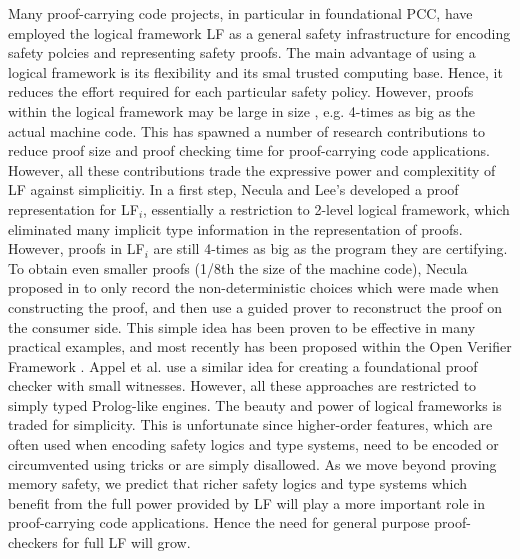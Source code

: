 \documentclass{acmconf}
\begin{document}
Many proof-carrying code projects, in particular in foundational PCC,
have employed the logical framework LF as a general safety
infrastructure for encoding safety polcies and representing safety
proofs\cite{AppelFelty00,Crary:POPL03,AppelFelten99,Crary:CADE03}.
The main advantage of using a logical framework is its flexibility
and its smal trusted computing base. Hence, it reduces the effort
required for each particular safety policy. However, proofs within the
logical framework may be large in size 
, e.g. 4-times as big as the
actual machine code. This has spawned a number of research
contributions to reduce proof size and proof checking time for
proof-carrying code applications. However, all these contributions
trade the expressive power and complexitity of LF against
simplicitiy. In a first step, Necula and Lee's \cite{Necula98lics} developed a
proof representation for LF$_i$, essentially a restriction to 2-level
logical framework, which eliminated many implicit type information in
the representation of proofs. However, proofs in LF$_i$ are still
4-times as big as the program they are certifying.
To obtain even smaller proofs (1/8th the size of the machine code),
Necula proposed in \cite{Necula+01:oracle} to only record the
non-deterministic choices which were made when constructing the proof,
and then use a guided prover to reconstruct the proof on the consumer
side. This simple idea has been proven to be effective in many
practical examples, and most recently has been proposed within the
Open Verifier Framework \cite{Necula}. Appel et al. use a similar idea
for creating a foundational proof checker with small
witnesses. However, all these approaches are restricted to simply 
typed Prolog-like engines. The beauty and power of logical frameworks
is traded for simplicity. This is unfortunate since higher-order
features, which are often used when encoding safety logics and type systems,
need to be encoded or circumvented using tricks or are simply
disallowed. As we move beyond proving memory safety, we predict that
richer safety logics and type systems which benefit from the full
power provided by LF will play a more important role in proof-carrying
code applications. Hence the need for general purpose proof-checkers
for full LF will grow.
\end{document}
